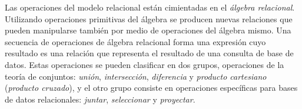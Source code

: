 Las operaciones del modelo relacional están cimientadas en el \emph{álgebra relacional}.
Utilizando operaciones primitivas del álgebra se producen nuevas relaciones que pueden manipularse también por medio de operaciones del álgebra mismo. Una secuencia de operaciones de álgebra relacional forma una expresión cuyo resultado es una relación que representa el resultado de una consulta de base de datos. Estas operaciones se pueden clasificar en dos grupos, operaciones de la teoría de conjuntos: \emph{unión}, \emph{intersección}, \emph{diferencia} y \emph{producto cartesiano} (\emph{producto cruzado}), y el otro grupo consiste en operaciones específicas para bases de datos relacionales: \emph{juntar}, \emph{seleccionar} y \emph{proyectar}.

